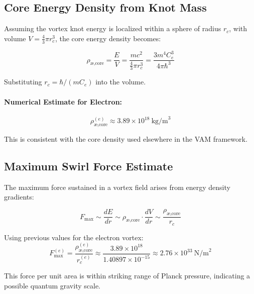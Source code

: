         \subsection{ Core Energy Density from Knot Mass}

        Assuming the vortex knot energy is localized within a sphere of radius $r_c$, with volume $V = \frac{4}{3} \pi r_c^3$, the core energy density becomes:

        \begin{equation}
        \rho_{\text{\ae,core}} = \frac{E}{V} = \frac{m c^2}{\frac{4}{3} \pi r_c^3} = \frac{3 m^4 C_e^3}{4 \pi \hbar^3}
        \end{equation}

        Substituting $r_c = \hbar / (m C_e)$ into the volume.


        \paragraph{Numerical Estimate for Electron:}
        \begin{equation}
        \rho_{\text{\ae,core}}^{(e)} \approx 3.89 \times 10^{18} \ \text{kg/m}^3
        \end{equation}

        This is consistent with the core density used elsewhere in the VAM framework.

        \subsection{ Maximum Swirl Force Estimate}
        The maximum force sustained in a vortex field arises from energy density gradients:

        \begin{equation}
        F_{\max} \sim \frac{dE}{dr} \sim \rho_{\text{\ae,core}} \cdot \frac{dV}{dr} \sim \frac{\rho_{\text{\ae,core}}}{r_c}
        \end{equation}

        Using previous values for the electron vortex:
        \begin{equation}
        F_{\max}^{(e)} = \frac{\rho_{\text{\ae,core}}^{(e)}}{r_c^{(e)}} \approx \frac{3.89 \times 10^{18}}{1.40897 \times 10^{-15}} \approx 2.76 \times 10^{33} \ \text{N/m}^2
        \end{equation}

        This force per unit area is within striking range of Planck pressure, indicating a possible quantum gravity scale.

